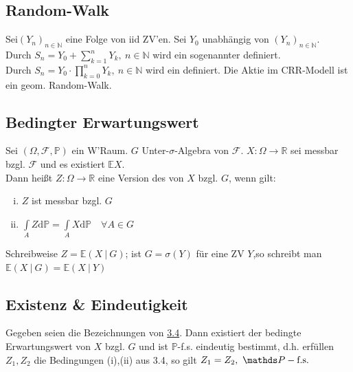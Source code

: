 
\subsection{Random-Walk}
\label{sub:random_walk}
Sei$(Y_n)_{n\in \mathds{N}}$ eine Folge von iid ZV'en. Sei $Y_0$ unabhängig von $(Y_n)_{n\in \mathds{N}}$.\\
Durch $S_n=Y_0+\sum\limits_{k=1}^{n}Y_k,~n\in \mathds{N}$ wird ein sogenannter  definiert.\\
Durch $S_n=Y_0\cdot \prod\limits_{k=0}^{n}Y_k,~n\in \mathds{N}$ wird ein  definiert. Die Aktie im CRR-Modell ist ein geom. Random-Walk.


\subsection{Bedingter Erwartungswert}
\label{sub:bed_ew}
Sei $(\Omega,\mathcal{F},\mathds{P})$ ein W'Raum. $G$ Unter-$\sigma$-Algebra von $\mathcal{F}$. $X:\Omega\to \mathds{R}$ sei messbar bzgl. $\mathcal{F}$ und es existiert  $\mathds{E}X$.\\
Dann heißt $Z:\Omega\to\mathds{R}$ eine Version des  von $X$ bzgl. $G$, wenn gilt:\\
\begin{enumerate}[(i)]
	\item $Z$ ist messbar bzgl. $G$
	\item $\int\limits_{A}Z\mathrm{d}\mathds{P}=\int\limits_{A}X\mathrm{d}\mathds{P}\quad \forall A\in G$
\end{enumerate}
Schreibweise $Z=\mathds{E}(X~|~G)$; ist $G=\sigma(Y)$ für eine ZV $Y$,so schreibt man $\mathds{E}(X~|~G)=\mathds{E}(X~|~Y)$


\subsection{Existenz \& Eindeutigkeit}
\label{sub:ex&eind}
Gegeben seien die Bezeichnungen von \hyperref[sub:bed_ew]{3.4}. Dann existiert der bedingte Erwartungswert von $X$ bzgl. $G$ und ist $\mathds{P}$-f.s. eindeutig bestimmt, d.h. erfüllen $Z_1,Z_2$ die Bedingungen (i),(ii) aus 3.4, so gilt $Z_1=Z_2,~\pfs$\\

